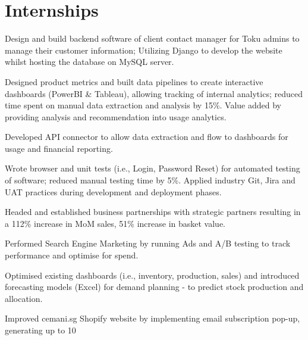 \documentclass[]{deedy-resume}
\begin{document}
\begin{minipage}[t]{0.66\textwidth} 


\section{Internships}
\vspace{\topsep} %
\begin{tightemize}
\item Design and build backend software of client contact manager for Toku admins to manage their customer information; Utilizing Django to develop the website whilst hosting the database on MySQL server.
\end{tightemize}
\sectionsep

\begin{tightemize}
\item Designed product metrics and built data pipelines to create interactive dashboards (PowerBI \& Tableau), allowing tracking of internal analytics; reduced time spent on manual data extraction and analysis by 15\%. Value added by providing analysis and recommendation into usage analytics.
\item Developed API connector to allow data extraction and flow to dashboards for usage and financial reporting.
\item Wrote browser and unit tests (i.e., Login, Password Reset) for automated testing of software; reduced manual testing time
by 5\%. Applied industry Git, Jira and UAT practices during development and deployment phases.
\end{tightemize}
\sectionsep

\begin{tightemize}
\item Headed and established business partnerships with strategic partners resulting in a 112\% increase in MoM sales, 51\% increase in basket value.
\item Performed Search Engine Marketing by running Ads and A/B testing to track performance and optimise for spend.
\item Optimised existing dashboards (i.e., inventory, production, sales) and introduced forecasting models (Excel) for demand planning - to predict stock production and allocation.
\item Improved cemani.sg Shopify website by implementing email subscription pop-up, generating up to 10%


\end{tightemize}
\end{minipage}
\end{document}
